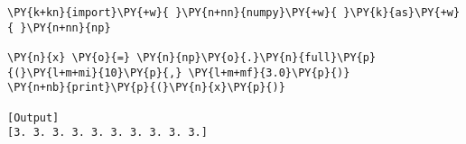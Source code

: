 \begin{Verbatim}[label=\makebox{\href{https://github.com/unipi-physics-labs/statnotes/tree/main/snippy/np.full.py}{https://github.com/.../np.full.py}},commandchars=\\\{\}]
\PY{k+kn}{import}\PY{+w}{ }\PY{n+nn}{numpy}\PY{+w}{ }\PY{k}{as}\PY{+w}{ }\PY{n+nn}{np}

\PY{n}{x} \PY{o}{=} \PY{n}{np}\PY{o}{.}\PY{n}{full}\PY{p}{(}\PY{l+m+mi}{10}\PY{p}{,} \PY{l+m+mf}{3.0}\PY{p}{)}
\PY{n+nb}{print}\PY{p}{(}\PY{n}{x}\PY{p}{)}

[Output]
[3. 3. 3. 3. 3. 3. 3. 3. 3. 3.]
\end{Verbatim}

